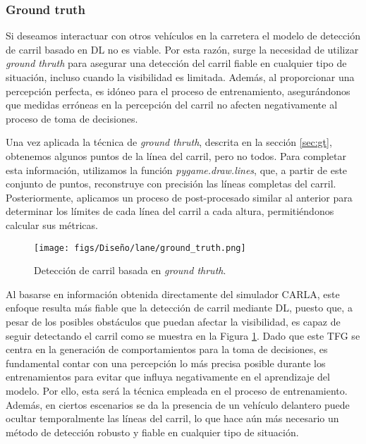 \subsubsection{Ground truth}

Si deseamos interactuar con otros vehículos en la carretera el modelo de detección de carril basado en \ac{DL} no es viable. Por esta razón, surge la necesidad de utilizar \textit{ground thruth} para asegurar una detección del carril fiable en cualquier tipo de situación, incluso cuando la visibilidad es limitada. Además, al proporcionar una percepción perfecta, es idóneo para el proceso de entrenamiento, asegurándonos que medidas erróneas en la percepción del carril no afecten negativamente al proceso de toma de decisiones. 

Una vez aplicada la técnica de \textit{ground thruth}, descrita en la sección \ref{sec:gt}, obtenemos algunos puntos de la línea del carril, pero no todos. Para completar esta información, utilizamos la función \textit{pygame.draw.lines}, que, a partir de este conjunto de puntos, reconstruye con precisión las líneas completas del carril. Posteriormente, aplicamos un proceso de post-procesado similar al anterior para determinar los límites de cada línea del carril a cada altura, permitiéndonos calcular sus métricas.

\begin{figure}[ht]
\centering
\texttt{[image: figs/Diseño/lane/ground\_truth.png]}
\caption{Detección de carril basada en \textit{ground thruth}.}
\label{fig:gt_final_carril}
\end{figure}

\newpage

Al basarse en información obtenida directamente del simulador CARLA, este enfoque resulta más fiable que la detección de carril mediante \ac{DL}, puesto que, a pesar de los posibles obstáculos que puedan afectar la visibilidad, es capaz de seguir detectando el carril como se muestra en la Figura \ref{fig:gt_final_carril}. Dado que este \ac{TFG} se centra en la generación de comportamientos para la toma de decisiones, es fundamental contar con una percepción lo más precisa posible durante los entrenamientos para evitar que influya negativamente en el aprendizaje del modelo. Por ello, esta será la técnica empleada en el proceso de entrenamiento. Además, en ciertos escenarios se da la presencia de un vehículo delantero puede ocultar temporalmente las líneas del carril, lo que hace aún más necesario un método de detección robusto y fiable en cualquier tipo de situación.

